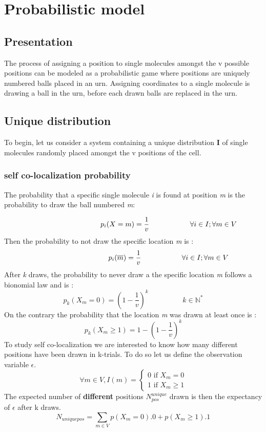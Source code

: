 \documentclass{article}
\begin{document}
\newpage
\section{Probabilistic model}

\subsection{Presentation}
The process of assigning a position to single molecules amongst the v possible positions can be modeled as a probabilistic game where
positions are uniquely numbered balls placed in an urn. Assigning coordinates to a single molecule is drawing a ball in the urn,
before each drawn balls are replaced in the urn.

\subsection{Unique distribution}
To begin, let us consider a system containing a unique distribution \textbf{I} of single molecules randomly placed amongst the v positions of the cell.

\subsubsection{self co-localization probability}
The probability that a specific single molecule \textit{i} is found at position \textit{m} is the probability to draw the ball numbered
\textit{m}:

\[
    \hspace{3.5cm} p_i(X=m) = \frac{1}{v} \hspace{2cm} \forall  i \in I; \forall m \in V
\]
Then the probability to not draw the specific location \textit{m} is :
\[
    \hspace{3.5cm} p_i(\overline{m}) = \frac{1}{v} \hspace{2cm} \forall  i \in I; \forall m \in V
\]
After \textit{k} draws, the probability to never draw a the specific location \textit{m} follows a bionomial law and is :
\[
p_k(X_m = 0) = (1 - \frac{1}{v})^k \hspace{2cm} k \in \mathbb{N^*}
\]
On the contrary the probability that the location \textit{m} was drawn at least once is :
\begin{equation}
p_k(X_m \geq 1) = 1-(1 - \frac{1}{v})^k
\end{equation}
To study self co-localization we are interested to know how many different positions have been drawn in k-trials. To do so let us 
define the observation variable $ \epsilon $.
\[
\forall m \in V, I(m) = \begin{cases}
    0 \text{ if } X_m = 0 \\
    1 \text{ if } X_m \geq 1
\end{cases}
\]
The expected number of \textbf{different} positions $ N^{unique}_{pos} $ drawn is then the expectancy of $ \epsilon $ after k draws.
\[
    N_{uniquepos} = \sum_{m \in V}p(X_m = 0).0 + p(X_m \geq 1).1
\]
\end{document}
